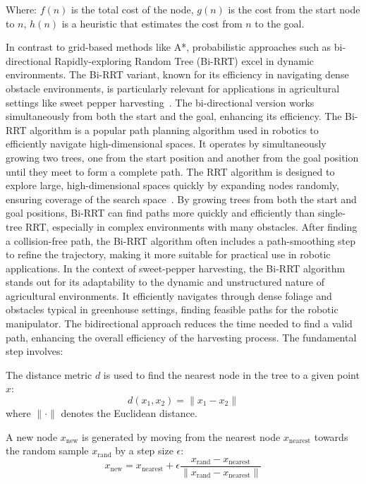 \documentclass{ieeeaccess}
\begin{document}
Where:
$f(n)$ is the total cost of the node, 
$g(n)$ is the cost from the start node to $n$, 
$h(n)$ is a heuristic that estimates the cost from $n$ to the goal.

In contrast to grid-based methods like A*, probabilistic approaches such as bi-directional Rapidly-exploring Random Tree (Bi-RRT) excel in dynamic environments. The Bi-RRT variant, known for its efficiency in navigating dense obstacle environments, is particularly relevant for applications in agricultural settings like sweet pepper harvesting~\cite {bac2016analysis}. The bi-directional version works simultaneously from both the start and the goal, enhancing its efficiency. 
The Bi-RRT algorithm is a popular path planning algorithm used in robotics to efficiently navigate high-dimensional spaces. It operates by simultaneously growing two trees, one from the start position and another from the goal position until they meet to form a complete path.
The RRT algorithm is designed to explore large, high-dimensional spaces quickly by expanding nodes randomly, ensuring coverage of the search space~\cite{lavalle1998rapidly}.
By growing trees from both the start and goal positions, Bi-RRT can find paths more quickly and efficiently than single-tree RRT, especially in complex environments with many obstacles.
After finding a collision-free path, the Bi-RRT algorithm often includes a path-smoothing step to refine the trajectory, making it more suitable for practical use in robotic applications.
In the context of sweet-pepper harvesting, the Bi-RRT algorithm stands out for its adaptability to the dynamic and unstructured nature of agricultural environments. It efficiently navigates through dense foliage and obstacles typical in greenhouse settings, finding feasible paths for the robotic manipulator. The bidirectional approach reduces the time needed to find a valid path, enhancing the overall efficiency of the harvesting process.
The fundamental step involves:

The distance metric \( d \) is used to find the nearest node in the tree to a given point \( x \):
\begin{equation}
d(x_1, x_2) = \| x_1 - x_2 \|
\end{equation}
where \( \| \cdot \| \) denotes the Euclidean distance.

A new node \( x_{\text{new}} \) is generated by moving from the nearest node \( x_{\text{nearest}} \) towards the random sample \( x_{\text{rand}} \) by a step size \( \epsilon \):
\begin{equation}
x_{\text{new}} = x_{\text{nearest}} + \epsilon \frac{x_{\text{rand}} - x_{\text{nearest}}}{\| x_{\text{rand}} - x_{\text{nearest}} \|}
\end{equation}
\end{document}

